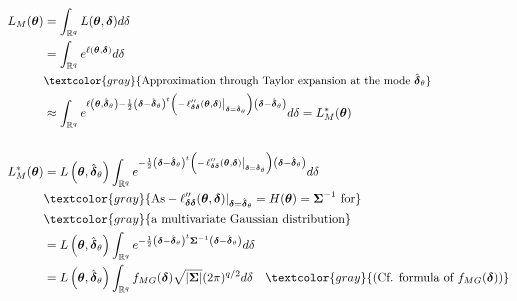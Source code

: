 $$
\begin{aligned}
L_{M}(\boldsymbol{\theta}) &=\int_{\mathbb{R}^{q}} L(\boldsymbol{\theta}, \boldsymbol{\delta}) d \delta \\
& =\int_{\mathbb{R}^{q}} e^{\ell(\boldsymbol{\theta}, \boldsymbol{\delta})} d \delta \\
&  \small \textcolor{gray}{\text{Approximation through Taylor expansion at the mode } \hat{\boldsymbol{\delta}}_{\theta}} \\
& \approx \int_{\mathbb{R}^{q}} e^{\ell\left(\boldsymbol{\theta}, \hat{\boldsymbol{\delta}}_{\theta}\right)-\frac{1}{2}\left(\boldsymbol{\delta}-\hat{\boldsymbol{\delta}}_{\theta}\right)^{t}\left(-\left.\ell_{\boldsymbol{\delta} \boldsymbol{\delta}}^{\prime \prime}(\boldsymbol{\theta}, \boldsymbol{\delta})\right|_{\boldsymbol{\delta}=\hat{\boldsymbol{\delta}}_{\theta}}\right)\left(\boldsymbol{\delta}-\hat{\boldsymbol{\delta}}_{\theta}\right)} d \delta = L_M^*(\boldsymbol{\theta}) \\ \\
L_M^*(\boldsymbol{\theta}) &=L\left(\boldsymbol{\theta}, \hat{\boldsymbol{\delta}}_{\theta}\right) \int_{\mathbb{R}^{q}} e^{-\frac{1}{2}\left(\boldsymbol{\delta}-\hat{\boldsymbol{\delta}}_{\theta}\right)^{t}\left(-\left.\ell_{\boldsymbol{\delta} \boldsymbol{\delta}}^{\prime \prime}(\boldsymbol{\theta}, \boldsymbol{\delta})\right|_{\boldsymbol{\delta}=\hat{\boldsymbol{\delta}}_{\theta}}\right)\left(\boldsymbol{\delta}-\hat{\boldsymbol{\delta}}_{\theta}\right)} d \delta \\
& \textcolor{gray}{\text{As} - \ell_{\boldsymbol{\delta} \boldsymbol{\delta}}^{\prime \prime}(\boldsymbol{\theta}, \boldsymbol{\delta}) |_{\boldsymbol{\delta}=\hat{\boldsymbol{\delta}}_{\theta}} = H(\boldsymbol{\theta}) = \boldsymbol{\Sigma}^{-1} \text{ for}} \\
&  \textcolor{gray}{\text{a multivariate Gaussian distribution}} \\
&= L\left(\boldsymbol{\theta}, \hat{\boldsymbol{\delta}}_{\theta}\right) \int_{\mathbb{R}^{q}} e^{-\frac{1}{2}\left(\boldsymbol{\delta}-\hat{\boldsymbol{\delta}}_{\theta}\right)^{t} \boldsymbol{\Sigma}^{-1} \left(\boldsymbol{\delta}-\hat{\boldsymbol{\delta}}_{\theta}\right)} d \delta \quad \\ &=L\left(\boldsymbol{\theta}, \hat{\boldsymbol{\delta}}_{\theta}\right) \int_{\mathbb{R}^{q}} f_{MG}(\boldsymbol{\delta}) \sqrt{|\boldsymbol{\Sigma}|} (2 \pi)^{q / 2} d \delta  \quad \textcolor{gray}{(\text{Cf. formula of }f_{MG}(\boldsymbol{\delta}))}\\

\end{aligned}$$
